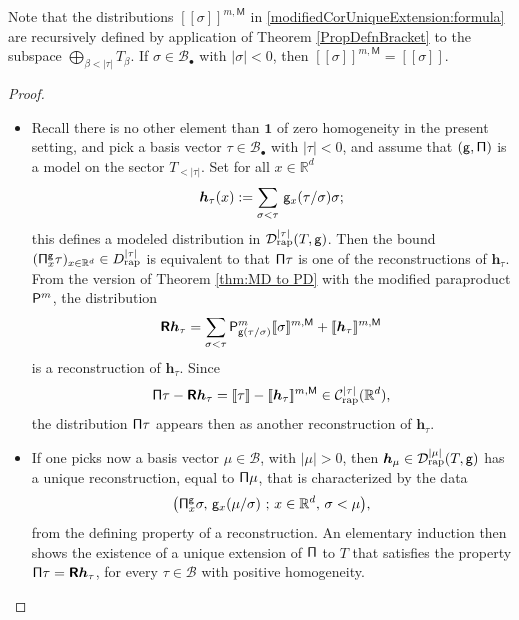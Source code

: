 \documentclass[10pt]{amsart}
\newcommand{\sbullet}{{\scriptscriptstyle\bullet}}
\theoremstyle{plain}
\theoremstyle{definition}
\newcommand{\unit}{\mathbf{1}}
\newcommand{\Brac}[1]{[\![#1]\!]}
\newcommand{\bsh}{\boldsymbol{h}}
\newcommand{\rap}{\mathrm{rap}}
\newcommand{\reR}{\boldsymbol{\mathsf{R}}}
\newcommand{\sfM}{\mathsf{M}}
\newcommand{\bbR}{\mathbb{R}}
\newcommand{\mcB}{\mathcal{B}}
\newcommand{\mcC}{\mathcal{C}}
\newcommand{\mcD}{\mathcal{D}}
\begin{document}
Note that the distributions $\Brac{\sigma}^{m,\sfM}$ in \eqref{modifiedCorUniqueExtension:formula} are recursively defined by application of Theorem \ref{PropDefnBracket} to the subspace $\bigoplus_{\beta<|\tau|}T_\beta$. If $\sigma\in\mcB_\sbullet$ with $\vert\sigma\vert<0$, then $\Brac{\sigma}^{m,\sfM}=\Brac{\sigma}$.

\skpt
\begin{proof}
\begin{itemize}
\item
Recall there is no other element than $\unit$ of zero homogeneity in the present setting, and pick a basis vector $\tau\in\mcB_\sbullet$ with $|\tau|<0$, and assume that $\sf(g,\Pi)$ is a model on the sector $T_{<|\tau|}$. Set for all $x\in\bbR^d$
\[
\bsh_\tau(x) := \sum_{\sigma<\tau}\, {\sf g}_x(\tau/\sigma)\sigma;
\]
this defines a modeled distribution in $\mcD_\rap^{|\tau|}(T,{\sf g})$. Then the bound $({\sf\Pi}_x^{\sf g}\tau)_{x\in\bbR^d}\in D_{\rap}^{|\tau|}$
is equivalent to that ${\sf \Pi}\tau$ is one of the reconstructions of $\bsh_\tau$. From the version of Theorem \ref{thm:MD to PD} with the modified paraproduct ${\sf P}^m$, the distribution
\[
\reR\bsh_\tau
=\sum_{\sigma<\tau} {\sf P}^m_{{\sf g}(\tau/\sigma)}\Brac{\sigma}^{m,{\sf M}} + \Brac{\bsh_\tau}^{m,{\sf M}}
\]
is a reconstruction of $\bsh_\tau$. Since
\[
{\sf \Pi}\tau - \reR\bsh_\tau = \Brac{\tau} - \Brac{\bsh_\tau}^{m,{\sf M}} \in \mcC_\rap^{|\tau|}(\bbR^d),
\]
the distribution ${\sf \Pi}\tau$ appears then as another reconstruction of $\bsh_\tau$.

\item
If one picks now a basis vector $\mu\in\mcB$, with $|\mu|>0$, then $\bsh_\mu\in\mcD_\rap^{|\mu|}(T,{\sf g})$ has a unique reconstruction, equal to ${\sf \Pi}\mu$, that is characterized by the data
\[
\bigl({\sf\Pi}_x^{\sf g}\sigma,\, {\sf g}_x(\mu/\sigma)\ ;\, x\in\bbR^d,\, \sigma<\mu\bigr),
\]
from the defining property of a reconstruction. An elementary induction then shows the existence of a unique extension of $\sf \Pi$ to $T$ that satisfies the property ${\sf \Pi}\tau = \reR\bsh_\tau$, for every $\tau\in\mcB$ with positive homogeneity.\qedhere
\end{itemize}
\end{proof}
\end{document}
